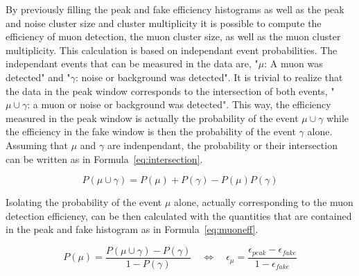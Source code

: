 	By previously filling the peak and fake efficiency histograms as well as the peak and noise cluster size and cluster multiplicity it is possible to compute the efficiency of muon detection, the muon cluster size, as well as the muon cluster multiplicity. This calculation is based on independant event probabilities. The independant events that can be measured in the data are, "$\mu$: A muon was detected" and "$\gamma$: noise or background was detected". It is trivial to realize that the data in the peak window corresponds to the intersection of both events, "$\mu\cup\gamma$: a muon or noise or background was detected". This way, the efficiency measured in the peak window is actually the probability of the event $\mu\cup\gamma$ while the efficiency in the fake window is then the probability of the event $\gamma$ alone. Assuming that $\mu$ and $\gamma$ are indenpendant, the probability or their intersection can be written as in Formula~\ref{eq:intersection}.
	
	\begin{equation}
	\label{eq:intersection}
	P(\mu\cup\gamma) = P(\mu) + P(\gamma) - P(\mu)P(\gamma)
	\end{equation}
	
	Isolating the probability of the event $\mu$ alone, actually corresponding to the muon detection efficiency, can be then calculated with the quantities that are contained in the peak and fake histogram as in Formula~\ref{eq:muoneff}.
	
	\begin{equation}
	\label{eq:muoneff}
	P(\mu) = \frac{P(\mu\cup\gamma) - P(\gamma)}{1 - P(\gamma)} \quad \Leftrightarrow \quad \epsilon_{\mu} = \frac{\epsilon_{peak} - \epsilon_{fake}}{1 - \epsilon_{fake}}
	\end{equation}
	

